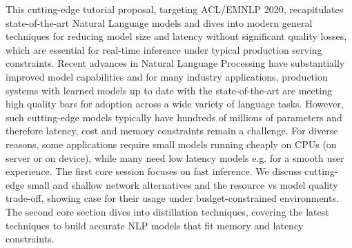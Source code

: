 This cutting-edge tutorial proposal, targeting ACL/EMNLP 2020, recapitulates state-of-the-art Natural Language models and dives into modern general techniques for reducing model size and latency without significant quality losses, which are essential for real-time inference under typical production serving constraints. Recent advances in Natural Language Processing have substantially improved model capabilities and for many industry applications, production systems with learned models up to date with the state-of-the-art are meeting high quality bars for adoption across a wide variety of language tasks. However, such cutting-edge models typically have hundreds of millions of parameters and therefore latency, cost and memory constraints remain a challenge. For diverse reasons, some applications require small models running cheaply on CPUs (on server or on device), while many need low latency models e.g. for a smooth user experience. The first core session focuses on fast inference. We discuss cutting-edge small and shallow network alternatives and the resource vs model quality trade-off, showing case for their usage under budget-constrained environments. The second core section dives into distillation techniques, covering the latest techniques to build accurate NLP models that fit memory and latency constraints.
